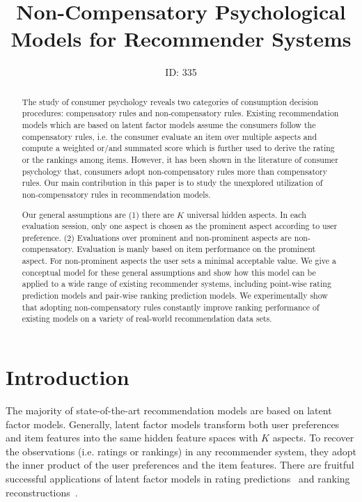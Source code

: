 \documentclass[letterpaper]{article} %
\begin{document}
%
\title{Non-Compensatory Psychological Models for Recommender Systems}
\author{ID: 335
}
\maketitle
\begin{abstract}
The study of consumer psychology reveals two categories of consumption decision procedures: compensatory rules and non-compensatory rules. Existing recommendation models which are based on latent factor models assume the consumers follow the compensatory rules, i.e. the consumer evaluate an item over multiple aspects and compute a weighted or/and summated score which is further used to derive the rating or the rankings among items. However, it has been shown in the literature of consumer psychology that, consumers adopt non-compensatory rules more than compensatory rules. Our main contribution in this paper is to study the unexplored utilization of non-compensatory rules in recommendation models. 

Our general assumptions are (1) there are $K$ universal hidden aspects. In each evaluation session, only one aspect is chosen as the prominent aspect according to user preference. (2) Evaluations over prominent and non-prominent aspects are non-compensatory. Evaluation is manly based on item performance on the prominent aspect. For non-prominent aspects the user sets a minimal acceptable value. We give a conceptual model for these general assumptions and show how this model can be applied to a wide range of existing recommender systems, including  point-wise rating prediction models and pair-wise ranking prediction models.  We experimentally show that adopting non-compensatory rules constantly improve ranking performance of existing models on a variety of real-world recommendation data sets.
\end{abstract}



\section{Introduction}\label{sec:introduction}
The majority of state-of-the-art recommendation models are based on latent factor models. Generally, latent factor models transform both user preferences and item features into the same hidden feature spaces with $K$ aspects. To recover the observations (i.e. ratings or rankings) in any recommender system, they adopt the inner product of the user preferences and the item features. There are fruitful successful applications of latent factor models in  rating predictions~\cite{Koren2009Matrix,Koren2010Factor,Lee2014Local} and ranking reconstructions~\cite{Rendle2009BPR,Steck2015Gaussian,Zhao2018Factored,Shi2010List}.   
\end{document}
